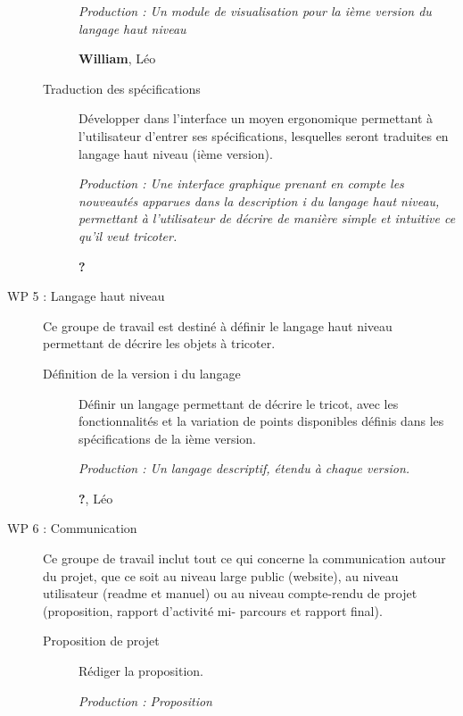 \documentclass{article}
\begin{document}
\begin{description}
\begin{description}
    \textit{Production : Un module de visualisation pour la ième version du langage haut niveau }

    \textbf{William}, Léo %

  \item[Traduction des spécifications] Développer dans l'interface un moyen ergonomique permettant à l'utilisateur d'entrer ses 
spécifications, lesquelles seront traduites en langage haut niveau (ième version).

    \textit{Production : Une interface graphique prenant en compte les nouveautés apparues dans la description i du langage haut niveau, 
permettant à l'utilisateur de décrire de manière simple et intuitive ce qu'il veut tricoter.}

    \textbf{?}
  \end{description}

\medskip

\item[WP 5 : Langage haut niveau] Ce groupe de travail est destiné à définir le langage haut niveau permettant de décrire les objets à 
tricoter.

  \begin{description}
  \item[Définition de la version i du langage] Définir un langage permettant de décrire le tricot, avec les fonctionnalités et la 
variation de points disponibles définis dans les spécifications de la ième version.

    \textit{Production : Un langage descriptif, étendu à chaque version.}

    \textbf{?}, Léo
  \end{description}

\medskip

\item[WP 6 : Communication] Ce groupe de travail inclut tout ce qui concerne la communication autour du projet, que ce soit au niveau 
large public (website), au niveau utilisateur (readme et manuel) ou au niveau compte-rendu de projet (proposition, rapport d'activité mi-
parcours et rapport final).


  \begin{description}
  \item[Proposition de projet] Rédiger la proposition.

    \textit{Production : Proposition}


\end{description}
\end{description}
\end{document}
